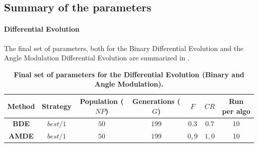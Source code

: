 \documentclass[12pt, openany]{article}
\begin{document}
\begin{table}[H]
        \centering
        \renewcommand{\arraystretch}{1.3}
        \caption{\textbf{Summary of statistical significance tests for the LDIW inertia schedules (Cases 64--66).} The Critical Difference (CD) sets the threshold for Nemenyi pairwise significance. No difference is significant ($p \ge 0.05$).}
        \label{tab:statistical_tests_ldiw}
    \end{table}





\subsection{Summary of the parameters}\label{sec:summary_parameters}

\paragraph{Differential Evolution} The final set of parameters, both for the Binary Differential Evolution and the Angle Modulation Differential Evolution are summarized in .

\begin{table}[H]
    \centering
    \renewcommand{\arraystretch}{1.5}
    \begin{tabular}{|c|c|c|c|c|c|c|}
        \hline 
        \textbf{Method} & \textbf{Strategy} & \textbf{Population ($NP$)} & \textbf{Generations ($G$)} & $F$ & $CR$ & \textbf{Run per algo} \\ \hline

        \textbf{BDE} & $best/1$ & $50$ & $199$ & $0.3$ & $0.7$ & 10 \\ \hdashline
        \textbf{AMDE} & $best/1$ & $50$ & $199$ & $0,9$ & $1,0$ & 10 \\ 
        \hline
    \end{tabular}
    \caption{\textbf{Final set of parameters for the Differential Evolution (Binary and Angle Modulation).}}
    \label{tab:Cases_Determine_BDE_F_CR}
\end{table}
\end{document}
